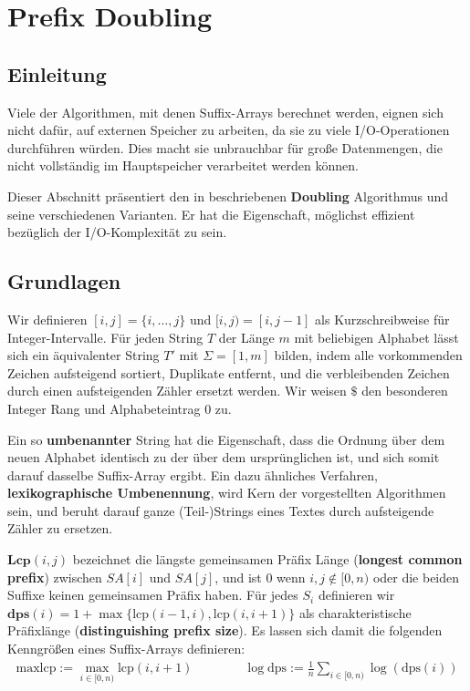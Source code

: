 \section{Prefix Doubling}

\subsection{Einleitung}

Viele  der Algorithmen, mit denen Suffix-Arrays berechnet werden, eignen sich nicht dafür, auf externen Speicher zu arbeiten, da sie zu viele I/O-Operationen durchführen würden. Dies macht sie unbrauchbar für große Datenmengen, die nicht vollständig im Hauptspeicher verarbeitet werden können.

Dieser Abschnitt präsentiert den in \cite{saca:11} beschriebenen \textbf{Doubling} Algorithmus und seine verschiedenen Varianten. Er hat die Eigenschaft, möglichst effizient bezüglich der I/O-Komplexität zu sein.

\subsection{Grundlagen}

Wir definieren $[i, j] = \{i, \dots, j\}$ und $[i, j) = [i, j - 1]$ als Kurzschreibweise für Integer-Intervalle. Für jeden String $T$ der Länge $m$ mit beliebigen Alphabet lässt sich ein äquivalenter String $T'$ mit $\Sigma = [1, m]$ bilden, indem alle vorkommenden Zeichen aufsteigend sortiert, Duplikate entfernt, und die verbleibenden Zeichen durch einen aufsteigenden Zähler ersetzt werden. Wir weisen $\$$ den besonderen Integer Rang und Alphabeteintrag $0$ zu.

Ein so \textbf{umbenannter} String hat die Eigenschaft, dass die Ordnung über dem neuen Alphabet identisch zu der über dem ursprünglichen ist, und sich somit darauf dasselbe Suffix-Array ergibt. Ein dazu ähnliches Verfahren, \textbf{lexikographische Umbenennung}, wird Kern der vorgestellten Algorithmen sein, und beruht darauf ganze (Teil-)Strings eines Textes durch aufsteigende Zähler zu ersetzen.

$\textbf{Lcp}(i, j)$ bezeichnet die längste gemeinsamen Präfix Länge (\textbf{longest common prefix}) zwischen $SA[i]$ und $SA[j]$, und ist $0$ wenn $i, j \notin [0, n)$ oder die beiden Suffixe keinen gemeinsamen Präfix haben. Für jedes $S_i$ definieren wir $\textbf{dps}(i) = 1 + \max\{\text{lcp}(i - 1, i), \text{lcp}(i, i + 1)\}$ als charakteristische Präfixlänge (\textbf{distinguishing prefix size}). Es lassen sich damit die folgenden Kenngrößen eines Suffix-Arrays definieren:
\begin{gather*}
\text{maxlcp} := \max_{i \in [0, n)} \text{lcp}(i, i + 1) 
\qquad\qquad
\log \text{dps} := \frac{1}{n} \sum_{i \in [0, n)} \log(\text{dps}(i))
\end{gather*}

